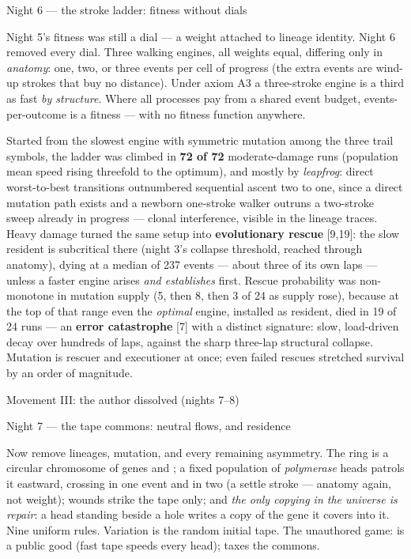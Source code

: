 \secc Night 6 --- the stroke ladder: fitness without dials

Night 5's fitness was still a dial --- a weight attached to lineage
identity. Night 6 removed every dial. Three walking engines, all
weights equal, differing only in {\it anatomy}: one, two, or three
events per cell of progress (the extra events are wind-up strokes
that buy no distance). Under axiom A3 a three-stroke engine is a
third as fast {\it by structure}.  Where all processes
pay from a shared event budget, events-per-outcome is a fitness ---
with no fitness function anywhere.

Started from the slowest engine with symmetric mutation among the
three trail symbols, the ladder was climbed in {\bf 72 of 72}
moderate-damage runs (population mean speed rising threefold to the
optimum), and mostly by {\it leapfrog}: direct worst-to-best
transitions outnumbered sequential ascent two to one, since a
direct mutation path exists and a newborn one-stroke walker outruns
a two-stroke sweep already in progress --- clonal interference,
visible in the lineage traces. Heavy damage turned the same setup
into {\bf evolutionary rescue} [9,19]: the slow resident is
subcritical there (night 3's collapse threshold, reached through
anatomy), dying at a median of 237 events --- about three of its
own laps --- unless a faster engine arises {\it and establishes}
first. Rescue probability was non-monotone in mutation supply
(5, then 8, then 3 of 24 as supply rose), because at the top of
that range even the {\it optimal} engine, installed as resident,
died in 19 of 24 runs --- an {\bf error catastrophe} [7] with a
distinct signature: slow, load-driven decay over hundreds of laps,
against the sharp three-lap structural collapse. Mutation is
rescuer and executioner at once; even failed rescues stretched
survival by an order of magnitude.

\sec Movement III: the author dissolved (nights 7--8)

\secc Night 7 --- the tape commons: neutral flows, and residence

Now remove lineages, mutation, and every remaining asymmetry. The
ring is a circular chromosome of genes  and ; a fixed
population of {\it polymerase} heads patrols it eastward, crossing
 in one event and  in two (a settle stroke --- anatomy
again, not weight); wounds strike the tape only; and {\it the only
copying in the universe is repair}: a head standing beside a hole
writes a copy of the gene it covers into it. Nine uniform rules.
Variation is the random initial tape. The unauthored game: 
is a public good (fast tape speeds every head);  taxes the
commons.

